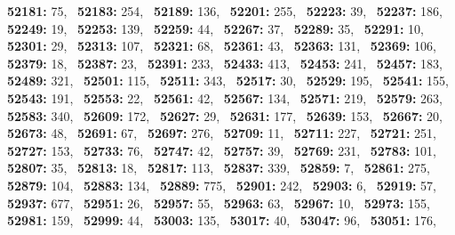 \textbf{52181:} 75,\allowbreak~ 
\textbf{52183:} 254,\allowbreak~ 
\textbf{52189:} 136,\allowbreak~ 
\textbf{52201:} 255,\allowbreak~ 
\textbf{52223:} 39,\allowbreak~ 
\textbf{52237:} 186,\allowbreak~ 
\textbf{52249:} 19,\allowbreak~ 
\textbf{52253:} 139,\allowbreak~ 
\textbf{52259:} 44,\allowbreak~ 
\textbf{52267:} 37,\allowbreak~ 
\textbf{52289:} 35,\allowbreak~ 
\textbf{52291:} 10,\allowbreak~ 
\textbf{52301:} 29,\allowbreak~ 
\textbf{52313:} 107,\allowbreak~ 
\textbf{52321:} 68,\allowbreak~ 
\textbf{52361:} 43,\allowbreak~ 
\textbf{52363:} 131,\allowbreak~ 
\textbf{52369:} 106,\allowbreak~ 
\textbf{52379:} 18,\allowbreak~ 
\textbf{52387:} 23,\allowbreak~ 
\textbf{52391:} 233,\allowbreak~ 
\textbf{52433:} 413,\allowbreak~ 
\textbf{52453:} 241,\allowbreak~ 
\textbf{52457:} 183,\allowbreak~ 
\textbf{52489:} 321,\allowbreak~ 
\textbf{52501:} 115,\allowbreak~ 
\textbf{52511:} 343,\allowbreak~ 
\textbf{52517:} 30,\allowbreak~ 
\textbf{52529:} 195,\allowbreak~ 
\textbf{52541:} 155,\allowbreak~ 
\textbf{52543:} 191,\allowbreak~ 
\textbf{52553:} 22,\allowbreak~ 
\textbf{52561:} 42,\allowbreak~ 
\textbf{52567:} 134,\allowbreak~ 
\textbf{52571:} 219,\allowbreak~ 
\textbf{52579:} 263,\allowbreak~ 
\textbf{52583:} 340,\allowbreak~ 
\textbf{52609:} 172,\allowbreak~ 
\textbf{52627:} 29,\allowbreak~ 
\textbf{52631:} 177,\allowbreak~ 
\textbf{52639:} 153,\allowbreak~ 
\textbf{52667:} 20,\allowbreak~ 
\textbf{52673:} 48,\allowbreak~ 
\textbf{52691:} 67,\allowbreak~ 
\textbf{52697:} 276,\allowbreak~ 
\textbf{52709:} 11,\allowbreak~ 
\textbf{52711:} 227,\allowbreak~ 
\textbf{52721:} 251,\allowbreak~ 
\textbf{52727:} 153,\allowbreak~ 
\textbf{52733:} 76,\allowbreak~ 
\textbf{52747:} 42,\allowbreak~ 
\textbf{52757:} 39,\allowbreak~ 
\textbf{52769:} 231,\allowbreak~ 
\textbf{52783:} 101,\allowbreak~ 
\textbf{52807:} 35,\allowbreak~ 
\textbf{52813:} 18,\allowbreak~ 
\textbf{52817:} 113,\allowbreak~ 
\textbf{52837:} 339,\allowbreak~ 
\textbf{52859:} 7,\allowbreak~ 
\textbf{52861:} 275,\allowbreak~ 
\textbf{52879:} 104,\allowbreak~ 
\textbf{52883:} 134,\allowbreak~ 
\textbf{52889:} 775,\allowbreak~ 
\textbf{52901:} 242,\allowbreak~ 
\textbf{52903:} 6,\allowbreak~ 
\textbf{52919:} 57,\allowbreak~ 
\textbf{52937:} 677,\allowbreak~ 
\textbf{52951:} 26,\allowbreak~ 
\textbf{52957:} 55,\allowbreak~ 
\textbf{52963:} 63,\allowbreak~ 
\textbf{52967:} 10,\allowbreak~ 
\textbf{52973:} 155,\allowbreak~ 
\textbf{52981:} 159,\allowbreak~ 
\textbf{52999:} 44,\allowbreak~ 
\textbf{53003:} 135,\allowbreak~ 
\textbf{53017:} 40,\allowbreak~ 
\textbf{53047:} 96,\allowbreak~ 
\textbf{53051:} 176,\allowbreak~ 
